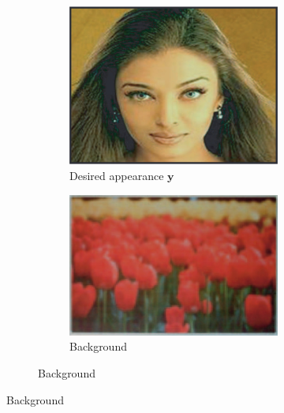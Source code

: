 \begin{figure}
    \centering    
    \begin{subfigure}{0.9\textwidth}
        \centering
        \begin{subfigure}{0.34\textwidth}
            \centering
            \includegraphics[width=\textwidth]{images/01-grossberg-desired_appearance.jpg}
            \caption{Desired appearance \(\bm{y}\)}
            \label{fig:intro_grossberg-desired_appearance}
        \end{subfigure}
        \hfill
        \begin{subfigure}{0.24\textwidth}
            \centering
            \includegraphics[width=\textwidth]{images/01-grossberg-background.jpg}
            \caption{Background}
            \label{fig:intro_grossberg-background}

\end{subfigure}
\end{subfigure}
\end{figure}
